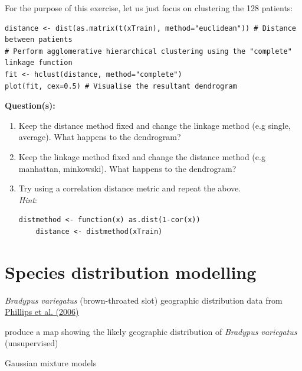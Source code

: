 \documentclass[a4paper,11pt]{article}
\begin{document}
For the purpose of this exercise, let us just focus on clustering the 128 patients:

\begin{lstlisting}[style=RCode]
distance <- dist(as.matrix(t(xTrain), method="euclidean")) # Distance between patients
# Perform agglomerative hierarchical clustering using the "complete" linkage function
fit <- hclust(distance, method="complete") 
plot(fit, cex=0.5) # Visualise the resultant dendrogram 
\end{lstlisting}

\begin{framed}
\textbf{Question(s):}
\begin{enumerate}
	\item Keep the distance method fixed and change the linkage method (e.g single, average). What happens to the dendrogram? 
	\item Keep the linkage method fixed and change the distance method (e.g manhattan, minkowski). What happens to the dendrogram?
	\item Try using a correlation distance metric and repeat the above. 
	\\
	\textit{Hint}:
	\begin{lstlisting}[style=RCode, backgroundcolor=\color{white}]
	distmethod <- function(x) as.dist(1-cor(x))
	distance <- distmethod(xTrain)
	\end{lstlisting}
	\vspace{-0.5cm} %
\end{enumerate}
\end{framed}

\clearpage
\section{Species distribution modelling}
\begin{framed}
\begin{description}[leftmargin=5em,style=nextline]\addtolength{\itemsep}{-0.2\baselineskip}
	\item[Data:] \textit{Bradypus variegatus} (brown-throated slot) geographic distribution data from \href{http://www.cs.princeton.edu/~schapire/maxent/}{Phillips et al. (2006)}	
	\item[Task:] produce a map showing the likely geographic distribution of \textit{Bradypus variegatus} (unsupervised)
	\item[Method:] Gaussian mixture models
\end{description} 
\end{framed}
\end{document}
